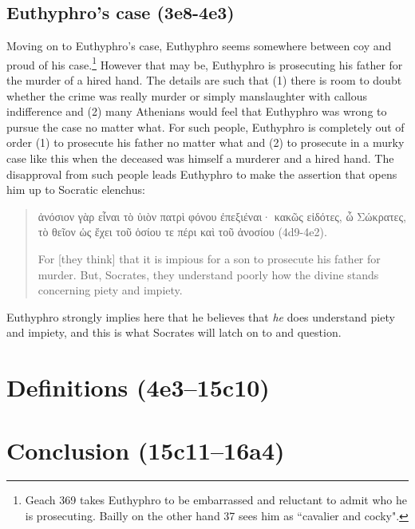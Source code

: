 \documentclass[11pt]{article}
\begin{document}
\subsection{Euthyphro's case (3e8-4e3)}

Moving on to Euthyphro's case, Euthyphro seems somewhere between coy and
proud of his case.\footnote{Geach \citeyearpar{geach1966} 369 takes
Euthyphro to be embarrassed and reluctant to admit who he is prosecuting.
Bailly on the other hand \citeyearpar{bailly2003} 37 sees him as
``cavalier and cocky".} However that may be, Euthyphro is prosecuting his
father for the murder of a hired hand. The details are such that (1) there
is room to doubt whether the crime was really murder or simply manslaughter
with callous indifference and (2) many Athenians would feel that Euthyphro
was wrong to pursue the case no matter what.  For such people, Euthyphro is
completely out of order (1) to prosecute his father no matter what and (2)
to prosecute in a murky case like this when the deceased was himself
a murderer and a hired hand.  The disapproval from such people leads
Euthyphro to make the assertion that opens him up to Socratic elenchus:

\begin{quote}
    ἀνόσιον γὰρ εἶναι τὸ ὑιὸν πατρὶ φόνου ἐπεξιέναι· κακῶς εἰδότες,
    ὦ Σώκρατες, τὸ θεῖον ὡς ἔχει τοῦ ὁσίου τε πέρι καὶ τοῦ ἀνοσίου
    (4d9-4e2).

    For [they think] that it is impious for a son to prosecute his father
    for murder. But, Socrates, they understand poorly how the divine stands
    concerning piety and impiety.
\end{quote}

Euthyphro strongly implies here that he believes that \emph{he} does
understand piety and impiety, and this is what Socrates will latch on to
and question.

\section{Definitions (4e3--15c10)}

\section{Conclusion (15c11--16a4)}



\end{document}
